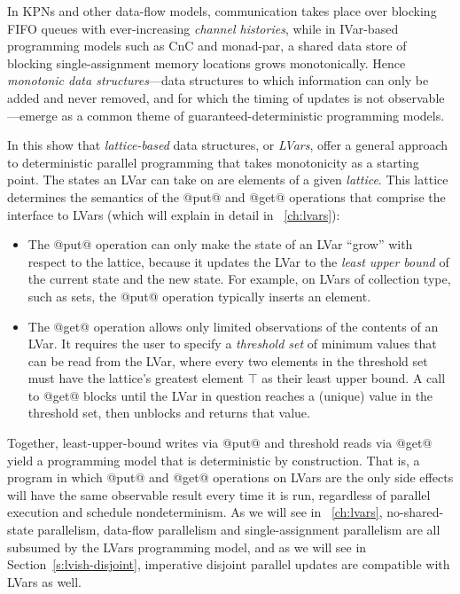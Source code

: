 In KPNs and other data-flow models, communication takes place over
blocking FIFO queues with ever-increasing \emph{channel histories},
while in IVar-based programming models such as CnC and monad-par, a
shared data store of blocking single-assignment memory locations grows
monotonically.  Hence \emph{monotonic data structures}---data
structures to which information can only be added and never removed,
and for which the timing of updates is not observable---emerge as a
common theme of guaranteed-deterministic programming models.

In this  show that \emph{lattice-based} data
structures, or \emph{LVars}, offer a general approach to deterministic
parallel programming that takes monotonicity as a starting point. The
states an LVar can take on are elements of a given
\emph{lattice}.  This lattice determines the
semantics of the @put@ and @get@ operations that comprise the
interface to LVars (which  will explain in detail in
~\ref{ch:lvars}):
\begin{itemize}
\item The @put@ operation can only make the state of an LVar ``grow''
  with respect to the lattice, because it updates the LVar to the
  \emph{least upper bound} of the current state and the new state.
  For example, on LVars of collection type, such as sets, the @put@ operation
  typically inserts an element.

\item The @get@ operation allows only limited observations of the
  contents of an LVar.  It requires the user to specify a
  \emph{threshold set} of minimum values that can be read from the
  LVar, where every two elements in the threshold set must have the
  lattice's greatest element $\top$ as their least upper bound.  A
  call to @get@ blocks until the LVar in question reaches a (unique)
  value in the threshold set, then unblocks and returns that value.
\end{itemize}
Together, least-upper-bound writes via @put@ and threshold reads via
@get@ yield a programming model that is deterministic by construction.  That
is, a program in which @put@ and @get@ operations on LVars are the
only side effects will have the same observable result every time it is run, regardless of
parallel execution and schedule nondeterminism.  As we will see in ~\ref{ch:lvars}, no-shared-state parallelism, data-flow
parallelism and single-assignment parallelism are all subsumed by the
LVars programming model, and as we will see in
Section~\ref{s:lvish-disjoint}, imperative disjoint parallel updates
are compatible with LVars as well.

